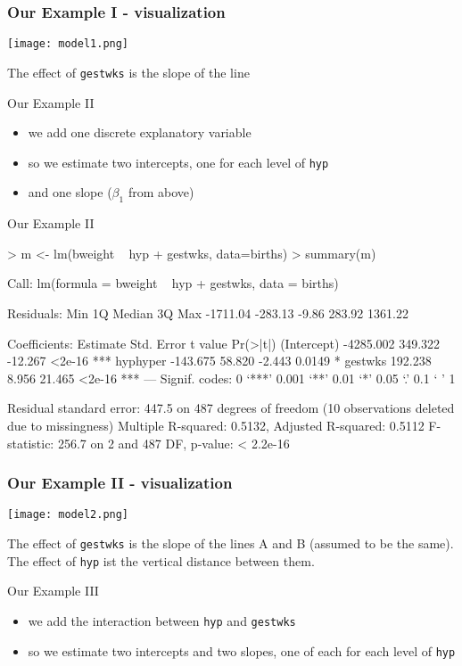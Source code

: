 \begin{frame}[shrink=5]\frametitle{Our Example I - visualization}
\texttt{[image: model1.png]}

The effect of \texttt{gestwks} is the slope of the line 
\end{frame}


\begin{frame}{Our Example II}
  \begin{itemize}
  \item we add one discrete explanatory variable
  \item so we estimate two intercepts, one for each level of \texttt{hyp} 
  \item and one slope ($\beta_1$ from above)
  \end{itemize}
\end{frame}



\begin{frame}[fragile]{Our Example II}\scriptsize
\begin{semiverbatim}
> m <- lm(bweight ~ hyp + gestwks, data=births)
> summary(m)

Call:
lm(formula = bweight ~ hyp + gestwks, data = births)

Residuals:
     Min       1Q   Median       3Q      Max 
-1711.04  -283.13    -9.86   283.92  1361.22 

Coefficients:
             Estimate Std. Error t value Pr(>|t|)    
(Intercept) -4285.002    349.322 -12.267   <2e-16 ***
hyphyper     -143.675     58.820  -2.443   0.0149 *  
gestwks       192.238      8.956  21.465   <2e-16 ***
---
Signif. codes:  0 ‘***’ 0.001 ‘**’ 0.01 ‘*’ 0.05 ‘.’ 0.1 ‘ ’ 1

Residual standard error: 447.5 on 487 degrees of freedom
  (10 observations deleted due to missingness)
Multiple R-squared:  0.5132,	Adjusted R-squared:  0.5112 
F-statistic: 256.7 on 2 and 487 DF,  p-value: < 2.2e-16
\end{semiverbatim}
\end{frame}

\begin{frame}[shrink=5]\frametitle{Our Example II - visualization}
\texttt{[image: model2.png]}

The effect of \texttt{gestwks} is the slope of the lines A and B (assumed to be the same). The effect of \texttt{hyp} ist the vertical distance between them.
\end{frame}


\begin{frame}{Our Example III}
  \begin{itemize}
  \item we add the interaction between \texttt{hyp} and \texttt{gestwks}
  \item so we estimate two intercepts and two slopes, one of each for each level of \texttt{hyp} 
  \end{itemize}
\end{frame}

